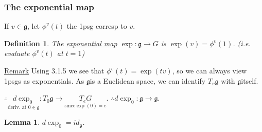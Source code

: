 \documentclass[12pt,a4paper]{article}
\newcommand{\tqn}[2]{\ensuremath{T_{#1} {#2}}}
\newcommand{\dgq}[2]{\ensuremath{d {#1}_{#2}}}
\newcommand{\lalg}{\ensuremath{\mathfrak{g}}}
\newcommand{\ul}[1]{\underline{#1}}
\newtheorem{defn}[thm]{Definition}
\newtheorem{lemma}[thm]{Lemma}
\begin{document}
\subsubsection{The exponential map}
If $v\in \lalg$, let $\phi^v(t)$ the 1psg corresp to $v$.
\begin{defn}
The \ul{exponential map} $\exp:\lalg\to G$ is $\exp(v)=\phi^v(1)$. (i.e. evaluate $\phi^v(t)$ at $t=1$)
\end{defn}
\ul{Remark} Using 3.1.5 we see that $\phi^v(t)=\exp(tv)$, so we can always view 1psgs as exponentials.
As \lalg is a Euclidean space, we can identify $\tqn{v}{\lalg}$ with \lalg itself.

$\therefore \underset{\text{deriv. at } 0 \in\lalg}{\dgq{\exp}{0}}:\tqn{0}{\lalg}\to \underset{\text{since} \exp(0)=e}{\tqn{e}{G}}$.
$\therefore \dgq{\exp}{0}:\lalg\to \lalg.$
\begin{lemma}
$ \dgq{\exp}{0}=id_{\lalg}$.
\end{lemma}
\end{document}
